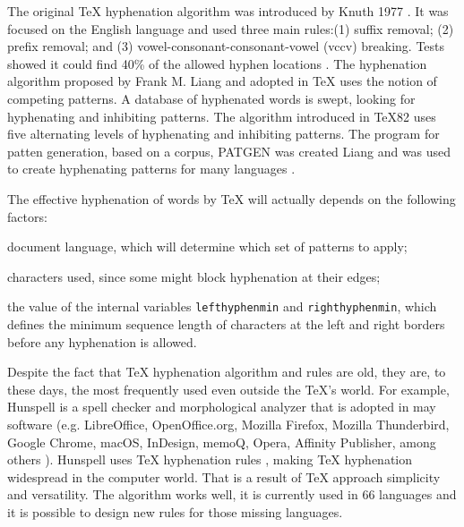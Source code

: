 \documentclass{article}
\begin{document}
The original \TeX{} hyphenation algorithm was introduced by Knuth 1977
\cite{knuth1977}. It was focused on the English language and used three main
rules:(1) suffix removal; (2) prefix removal; and (3)
vowel-consonant-consonant-vowel (vccv) breaking. Tests showed it could find
40\% of the allowed hyphen locations \cite{liang1983}. The hyphenation
algorithm proposed by Frank M. Liang and adopted in \TeX{} uses the notion of
competing patterns. A database of hyphenated words is swept, looking for
hyphenating and inhibiting patterns. The algorithm introduced in \TeX{}82 uses
five alternating levels of hyphenating and inhibiting patterns. The program
for patten generation, based on a corpus, PATGEN was created Liang
\cite{liangbreitenlohner1999} and was used to create hyphenating patterns for
many languages
\cite{sojka1995,sojka1995a,sojka2005thesis,sojka2003,scannell2003}.

The effective hyphenation of words by \TeX{} will actually depends on the following factors:
\begin{enumerate*}[label=\arabic*)]
    \item document language, which will determine which set of patterns to apply;
    \item characters used, since some might block hyphenation at their edges;
    \item the value of the internal variables \verb|lefthyphenmin| and \verb|righthyphenmin|,
        which defines the minimum sequence length of characters at the left and right borders
        before any hyphenation is allowed.
\end{enumerate*}

Despite the fact that \TeX{} hyphenation algorithm and rules are old, they are,
to these days, the most frequently used even outside the \TeX{}'s world. For
example, Hunspell is a spell checker and morphological analyzer that is adopted
in may software (e.g. LibreOffice, OpenOffice.org, Mozilla Firefox, Mozilla
Thunderbird, Google Chrome, macOS, InDesign, memoQ, Opera, Affinity Publisher,
among others \cite{hunspell}). Hunspell uses \TeX{} hyphenation rules
\cite{hunspellhyphen}, making \TeX{} hyphenation widespread in the computer
world. That is a result of \TeX{} approach simplicity and versatility. The
algorithm works well, it is currently used in 66 languages
\cite{texhyphenrules} and it is possible to design new rules for those missing
languages.
\end{document}
